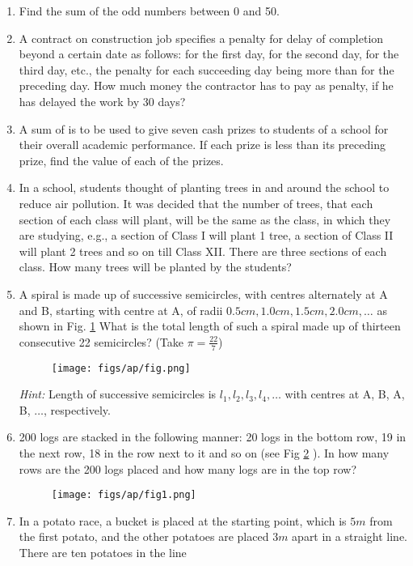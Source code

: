 \begin{enumerate}[label=\thesubsection.\arabic*, ref=\thesubsection.\theenumi]
\item Find the sum of the odd numbers between 0 and 50.
\item A contract on construction job specifies a penalty for delay of completion beyond a
certain date as follows:  for the first day,  for the second day,   for the third
day,  etc.,  the penalty for each succeeding day being  more than for the preceding day. How much money the contractor has to pay as penalty,  if he has delayed the work by 30 days?
\item A sum of  is to be used to give seven cash prizes to students of a school for their overall academic performance. If each prize is  less than its preceding prize,  find the value of each of the prizes.
\item  In a school,  students thought of planting trees in and around the school to reduce air pollution. It was decided that the number of trees,  that each section of each class will plant,  will be the same as the class,  in which they are studying,  
e.g.,  a section of Class I will plant 1 tree,  
a section of Class II will plant 2 trees and so on till Class XII. There are three sections of each class. How many trees will be planted by the students?
\item A spiral is made up of successive semicircles,  with centres alternately at A and B,  starting with centre at A,  of radii $0.5 cm,  1.0 cm,  1.5 cm,  2.0 cm, \dots $  as shown in Fig.
		\ref{fig:fig}
	What is the total length of such a spiral made up of thirteen consecutive 22 semicircles? (Take $\pi =\frac{22}{7}$)
	\begin{figure}[H]
		\centering
\texttt{[image: figs/ap/fig.png]} 
		\caption{}
		\label{fig:fig}
	\end{figure}
{\em Hint:} Length of successive semicircles is $l_1,  l_2,  l_3,  l_4 ,  \dots$ with centres at A,  B,  A,  B,  $\dots $, respectively.
\item 200 logs are stacked in the following manner: 20 logs in the bottom row,  19 in the next row,  18 in the row next to it and so on (see Fig
		\ref{fig:fig1}
	). In how many rows are the 200 logs placed and how many logs are in the top row?
	\begin{figure}[H]
		\centering
\texttt{[image: figs/ap/fig1.png]}
		\caption{}
		\label{fig:fig1}
	\end{figure}
\item In a potato race,  a bucket is placed at the starting point,  which is $5m$ from the first potato,  and the other potatoes are placed $3m$ apart in a straight line. There are ten potatoes in the line

\end{enumerate}
